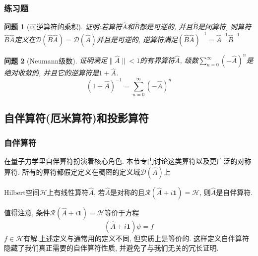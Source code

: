 \documentclass[a4paper,11pt]{article}
\theoremstyle{mystyle}
\newtheorem{problem}{问题}[section]
\begin{document}
\subsubsection{练习题}
\begin{problem}[可逆算符的乘积]
  证明:若算符$\hat{A}$和$\hat{B}$都是可逆的, 并且$\hat{B}$是闭算符, 则算符$\hat{B}\hat{A}$定义在$\mathcal{D}(\hat{B}\hat{A})=\mathcal{D}(\hat{A})$并且是可逆的, 逆算符满足$(\hat{B}\hat{A})^{-1}=\hat{A}^{-1}\hat{B}^{-1}$
\end{problem}
\begin{problem}[Neumann级数]\label{Neumann series}
  证明满足$\|\hat{A}\|<1$的有界算符$\hat{A}$, 级数$\sum_{n=0}^{\infty}(-\hat{A})^n$是绝对收敛的, 并且它的逆算符是$1+\hat{A}$.
\begin{equation*}
  (1+\hat{A})^{-1}=\sum_{n=0}^{\infty}(-\hat{A})^n
\end{equation*}
\end{problem}
\subsection{自伴算符(厄米算符)和投影算符}
\subsubsection{自伴算符}
在量子力学里自伴算符扮演着核心角色. 本节专门讨论这类算符以及更广泛的对称算符. 所有的算符都假定定义在稠密的定义域$\mathcal{D}(\hat{A})$上
\begin{definition}[自伴算符]\label{Self-adjoint def 1}
  Hilbert空间$\mathcal{H}$上有线性算符$\hat{A}$, 若$\hat{A}$是对称的且$\mathcal{R}(\hat{A}+i\mathbf{1})=\mathcal{H}$, 则$\hat{A}$是自伴算符.
\end{definition}
值得注意, 条件$\mathcal{R}(\hat{A}+i\mathbf{1})=\mathcal{H}$等价于方程
\begin{equation*}
  (\hat{A}+i\mathbf{1})\psi=f
\end{equation*}
$f\in\mathcal{H}$有解.上述定义与通常用的定义不同, 但实质上是等价的. 这样定义自伴算符隐藏了我们真正需要的自伴算符性质, 并避免了与我们无关的冗长证明.
\end{document}
